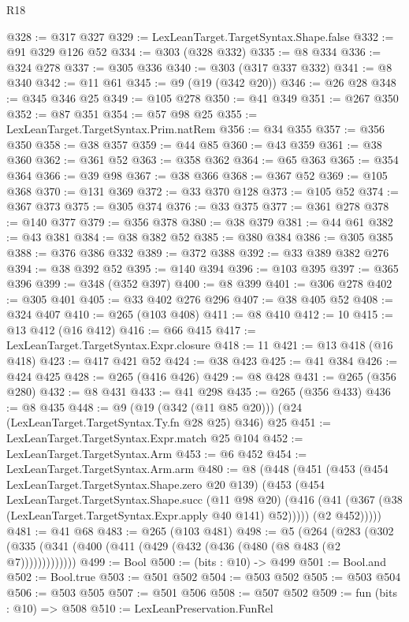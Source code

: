 \begin{lexlean}{R18}
\begin{coremodule}
@328 := @317 @327
@329 := LexLeanTarget.TargetSyntax.Shape.false
@332 := @91 @329 @126 @52
@334 := @303 (@328 @332)
@335 := @8 @334
@336 := @324 @278
@337 := @305 @336
@340 := @303 (@317 @337 @332)
@341 := @8 @340
@342 := @11 @61
@345 := @9 (@19 (@342 @20))
@346 := @26 @28
@348 := @345 @346 @25
@349 := @105 @278
@350 := @41 @349
@351 := @267 @350
@352 := @87 @351
@354 := @57 @98 @25
@355 := LexLeanTarget.TargetSyntax.Prim.natRem
@356 := @34 @355
@357 := @356 @350
@358 := @38 @357
@359 := @44 @85
@360 := @43 @359
@361 := @38 @360
@362 := @361 @52
@363 := @358 @362
@364 := @65 @363
@365 := @354 @364
@366 := @39 @98
@367 := @38 @366
@368 := @367 @52
@369 := @105 @368
@370 := @131 @369
@372 := @33 @370 @128
@373 := @105 @52
@374 := @367 @373
@375 := @305 @374
@376 := @33 @375
@377 := @361 @278
@378 := @140 @377
@379 := @356 @378
@380 := @38 @379
@381 := @44 @61
@382 := @43 @381
@384 := @38 @382 @52
@385 := @380 @384
@386 := @305 @385
@388 := @376 @386 @332
@389 := @372 @388
@392 := @33 @389 @382 @276
@394 := @38 @392 @52
@395 := @140 @394
@396 := @103 @395
@397 := @365 @396
@399 := @348 (@352 @397)
@400 := @8 @399
@401 := @306 @278
@402 := @305 @401
@405 := @33 @402 @276 @296
@407 := @38 @405 @52
@408 := @324 @407
@410 := @265 (@103 @408)
@411 := @8 @410
@412 := 10
@415 := @13 @412 (@16 @412)
@416 := @66 @415
@417 := LexLeanTarget.TargetSyntax.Expr.closure
@418 := 11
@421 := @13 @418 (@16 @418)
@423 := @417 @421 @52
@424 := @38 @423
@425 := @41 @384
@426 := @424 @425
@428 := @265 (@416 @426)
@429 := @8 @428
@431 := @265 (@356 @280)
@432 := @8 @431
@433 := @41 @298
@435 := @265 (@356 @433)
@436 := @8 @435
@448 := @9 (@19 (@342 (@11 @85 @20))) (@24 (LexLeanTarget.TargetSyntax.Ty.fn @28 @25) @346) @25
@451 := LexLeanTarget.TargetSyntax.Expr.match @25 @104
@452 := LexLeanTarget.TargetSyntax.Arm
@453 := @6 @452
@454 := LexLeanTarget.TargetSyntax.Arm.arm
@480 := @8
    (@448
      (@451
        (@453
          (@454 LexLeanTarget.TargetSyntax.Shape.zero @20 @139)
          (@453
            (@454
              LexLeanTarget.TargetSyntax.Shape.succ
              (@11 @98 @20)
              (@416 (@41 (@367 (@38 (LexLeanTarget.TargetSyntax.Expr.apply @40 @141) @52)))))
            (@2 @452)))))
@481 := @41 @68
@483 := @265 (@103 @481)
@498 := @5
    (@264 (@283 (@302 (@335 (@341 (@400 (@411 (@429 (@432 (@436 (@480 (@8 @483 (@2 @7)))))))))))))
@499 := Bool
@500 := (bits : @10) -> @499
@501 := Bool.and
@502 := Bool.true
@503 := @501 @502
@504 := @503 @502
@505 := @503 @504
@506 := @503 @505
@507 := @501 @506
@508 := @507 @502
@509 := fun (bits : @10) => @508
@510 := LexLeanPreservation.FunRel

\end{coremodule}
\end{lexlean}
